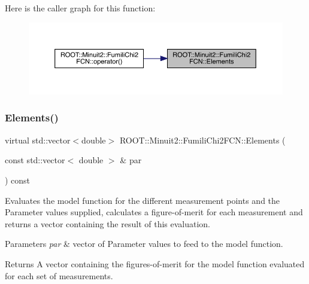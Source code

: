 Here is the caller graph for this function\+:
\nopagebreak
\begin{figure}[H]
\begin{center}
\leavevmode
\includegraphics[width=350pt]{d3/df0/classROOT_1_1Minuit2_1_1FumiliChi2FCN_a25cc8dcc2eff831b3c0a94bf5413c2cd_icgraph}
\end{center}
\end{figure}
\mbox{\label{classROOT_1_1Minuit2_1_1FumiliChi2FCN_a25cc8dcc2eff831b3c0a94bf5413c2cd}} 
\subsubsection{\texorpdfstring{Elements()}{Elements()}\hspace{0.1cm}{\footnotesize\ttfamily [2/3]}}
{\footnotesize\ttfamily virtual std\+::vector$<$double$>$ R\+O\+O\+T\+::\+Minuit2\+::\+Fumili\+Chi2\+F\+C\+N\+::\+Elements (\begin{DoxyParamCaption}\item[{const std\+::vector$<$ double $>$ \&}]{par }\end{DoxyParamCaption}) const\hspace{0.3cm}{\ttfamily [pure virtual]}}

Evaluates the model function for the different measurement points and the Parameter values supplied, calculates a figure-\/of-\/merit for each measurement and returns a vector containing the result of this evaluation.


\begin{DoxyParams}{Parameters}
{\em par} & vector of Parameter values to feed to the model function.\\
\hline
\end{DoxyParams}
\begin{DoxyReturn}{Returns}
A vector containing the figures-\/of-\/merit for the model function evaluated for each set of measurements. 
\end{DoxyReturn}


